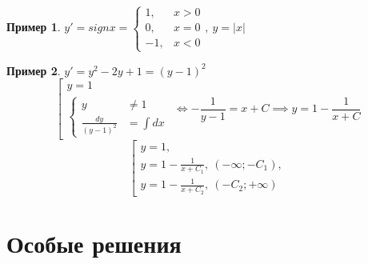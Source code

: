 \documentclass[11pt,a4paper,oneside]{report}
\theoremstyle{definition}
\newtheorem{example}{Пример}
\theoremstyle{plain}
\theoremstyle{remark}
\begin{document}
\begin{example}
    $y'=sign x = \left\{\begin{array}{rl}
            1,  & x > 0 \\
            0,  & x = 0 \\
            -1, & x < 0
        \end{array}\right., \ y = |x|$
\end{example}

\begin{example}
    $y' = y^2 - 2y + 1 = (y-1)^2$
    \begin{equation*}
        \left[\begin{array}{l}
            y = 1 \\
            \left\{\begin{array}{rl}
                       y                    & \ne 1     \\
                       \frac{dy}{(y - 1)^2} & = \int dx
                   \end{array}\right.
        \end{array}\right. \iff -\frac{1}{y-1} = x + C \implies y = 1 - \frac{1}{x + C}
    \end{equation*}
    \begin{equation*}
        \left[\begin{array}{l}
            y = 1,                                       \\
            y = 1 - \frac{1}{x + C_1}, \ (-\infty;-C_1), \\
            y = 1 - \frac{1}{x + C_2}, \ (-C_2;+\infty)
        \end{array}\right.
    \end{equation*}
\end{example}

\section{Особые решения}
\end{document}
